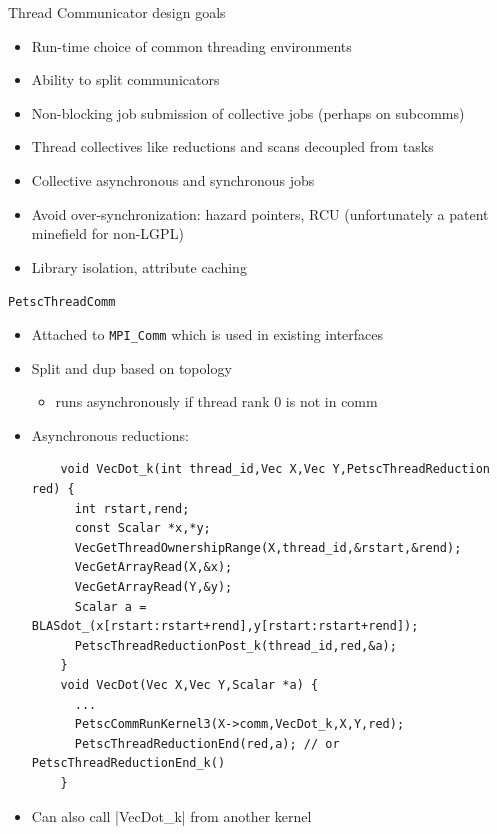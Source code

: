 \documentclass{beamer}
\begin{document}
\begin{frame}{Thread Communicator design goals}
  \begin{itemize}
  \item Run-time choice of common threading environments
  \item Ability to split communicators
  \item Non-blocking job submission of collective jobs (perhaps on subcomms)
  \item Thread collectives like reductions and scans decoupled from tasks
  \item Collective asynchronous and synchronous jobs
  \item Avoid over-synchronization: hazard pointers, RCU (unfortunately a patent minefield for non-LGPL)
  \item Library isolation, attribute caching
  \end{itemize}
\end{frame}

\begin{frame}[fragile]{\texttt{PetscThreadComm}}
  \begin{itemize}
  \item Attached to \texttt{MPI\_Comm} which is used in existing interfaces
  \item Split and dup based on topology
    \begin{itemize}
    \item runs asynchronously if thread rank 0 is not in comm
    \end{itemize}
  \item Asynchronous reductions: {\scriptsize
    \begin{verbatim}
    void VecDot_k(int thread_id,Vec X,Vec Y,PetscThreadReduction red) {
      int rstart,rend;
      const Scalar *x,*y;
      VecGetThreadOwnershipRange(X,thread_id,&rstart,&rend);
      VecGetArrayRead(X,&x);
      VecGetArrayRead(Y,&y);
      Scalar a = BLASdot_(x[rstart:rstart+rend],y[rstart:rstart+rend]);
      PetscThreadReductionPost_k(thread_id,red,&a);
    }
    void VecDot(Vec X,Vec Y,Scalar *a) {
      ...
      PetscCommRunKernel3(X->comm,VecDot_k,X,Y,red);
      PetscThreadReductionEnd(red,a); // or PetscThreadReductionEnd_k()
    }
    \end{verbatim}
    }
  \item Can also call \cfunc|VecDot_k| from another kernel
  \end{itemize}
\end{frame}
\end{document}
